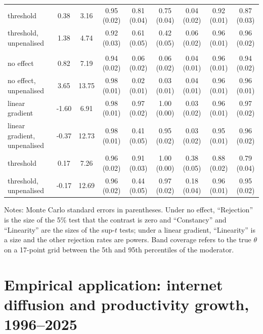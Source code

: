 \documentclass[preprint,12pt,authoryear]{elsarticle}
\begin{document}
\begin{table}[!t]
\begin{threeparttable}
\begin{tabular}{lcccccccc}
\quad threshold & 0.38 & 3.16 & 0.95 (0.02) & 0.81 (0.04) & 0.75 (0.04) & 0.04 (0.02) & 0.92 (0.01) & 0.87 (0.03)\\
\quad threshold, unpenalised & 1.38 & 4.74 & 0.92 (0.03) & 0.61 (0.05) & 0.42 (0.05) & 0.06 (0.02) & 0.96 (0.01) & 0.96 (0.02)\\
\addlinespace
\multicolumn{9}{l}{\textit{Moderator: Years since take-off}}\\
\quad no effect & 0.82 & 7.19 & 0.94 (0.02) & 0.06 (0.02) & 0.06 (0.02) & 0.04 (0.01) & 0.96 (0.01) & 0.94 (0.02)\\
\quad no effect, unpenalised & 3.65 & 13.75 & 0.98 (0.01) & 0.02 (0.01) & 0.03 (0.01) & 0.04 (0.01) & 0.96 (0.01) & 0.96 (0.01)\\
\quad linear gradient & -1.60 & 6.91 & 0.98 (0.01) & 0.97 (0.02) & 1.00 (0.00) & 0.03 (0.02) & 0.96 (0.01) & 0.97 (0.02)\\
\quad linear gradient, unpenalised & -0.37 & 12.73 & 0.98 (0.01) & 0.41 (0.05) & 0.95 (0.02) & 0.03 (0.02) & 0.95 (0.01) & 0.96 (0.02)\\
\quad threshold & 0.17 & 7.26 & 0.96 (0.02) & 0.91 (0.03) & 1.00 (0.00) & 0.38 (0.05) & 0.88 (0.02) & 0.79 (0.04)\\
\quad threshold, unpenalised & -0.17 & 12.69 & 0.96 (0.02) & 0.44 (0.05) & 0.97 (0.02) & 0.18 (0.04) & 0.96 (0.01) & 0.95 (0.02)\\
\bottomrule
\end{tabular}
\begin{tablenotes}\scriptsize
\item Notes: Monte Carlo standard errors in parentheses. Under no effect, ``Rejection'' is the size of the 5\% test that the contrast is zero and ``Constancy'' and ``Linearity'' are the sizes of the sup-$t$ tests; under a linear gradient, ``Linearity'' is a size and the other rejection rates are powers. Band coverage refers to the true $\theta$ on a 17-point grid between the 5th and 95th percentiles of the moderator.
\end{tablenotes}
\end{threeparttable}
\end{table}

\section{Empirical application: internet diffusion and productivity growth, 1996--2025}\label{sec:emp}
\end{document}
